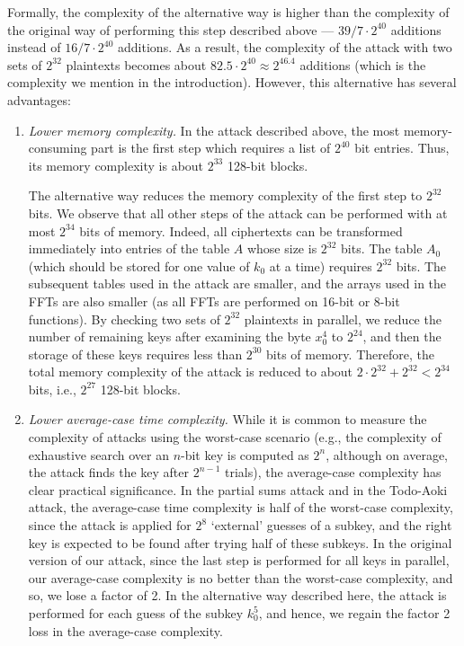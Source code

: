 Formally, the complexity of the alternative way is higher than the complexity of the original way of performing this step described above --- $39/7 \cdot 2^{40}$ additions instead of $16/7 \cdot 2^{40}$ additions. As a result, the complexity of the attack with two sets of $2^{32}$ plaintexts becomes about $82.5 \cdot 2^{40} \approx 2^{46.4}$ additions (which is the complexity we mention in the introduction). However, this alternative has several advantages:
\begin{enumerate}
    \item \emph{Lower memory complexity.} In the attack described above, the most memory-consuming part is the first step which requires a list of $2^{40}$ bit entries. Thus, its memory complexity is about $2^{33}$ 128-bit blocks. 

    The alternative way reduces the memory complexity of the first step to $2^{32}$ bits. We observe that all other steps of the attack can be performed with at most $2^{34}$ bits of memory. Indeed, all ciphertexts can be transformed immediately into entries of the table $A$ whose size is $2^{32}$ bits. The table $A_0$ (which should be stored for one value of $k_0$ at a time) requires $2^{32}$ bits. The subsequent tables used in the attack are smaller, and the arrays used in the FFTs are also smaller (as all FFTs are performed on 16-bit or 8-bit functions). By checking two sets of $2^{32}$ plaintexts in parallel, we reduce the number of remaining keys after examining the byte $x^4_0$ to $2^{24}$, and then the storage of these keys requires less than $2^{30}$ bits of memory. Therefore, the total memory complexity of the attack is reduced to about $2 \cdot 2^{32} + 2^{32}<2^{34}$ bits, i.e., $2^{27}$ 128-bit blocks.

    \item \emph{Lower average-case time complexity.} While it is common to measure the complexity of attacks using the worst-case scenario (e.g., the complexity of exhaustive search over an $n$-bit key is computed as $2^n$, although on average, the attack finds the key after $2^{n-1}$ trials), the average-case complexity has clear practical significance. In the partial sums attack and in the Todo-Aoki attack, the average-case time complexity is half of the worst-case complexity, since the attack is applied for $2^8$ `external' guesses of a subkey, and the right key is expected to be found after trying half of these subkeys. In the original version of our attack, since the last step is performed for all keys in parallel, our average-case complexity is no better than the worst-case complexity, and so, we lose a factor of 2. In the alternative way described here, the attack is performed for each guess of the subkey $k^5_0$, and hence, we regain the factor 2 loss in the average-case complexity.


\end{enumerate}
